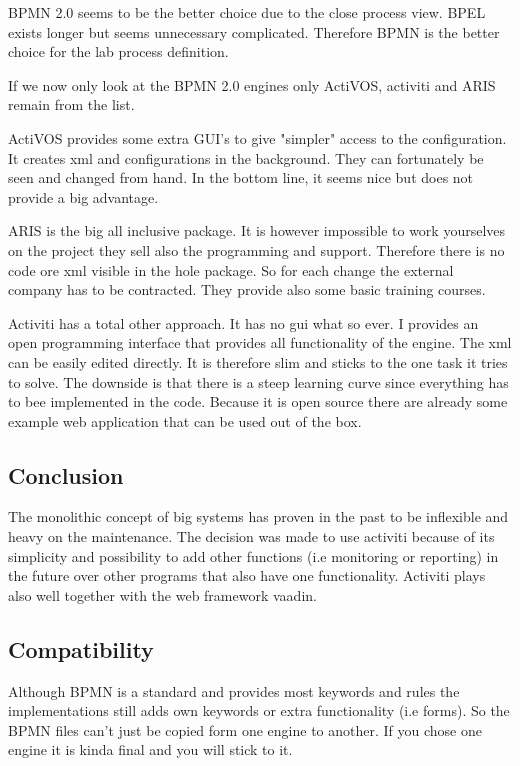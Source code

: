 \documentclass[paper=a4,twoside=false,BCOR=0mm,DIV=calc,fontsize=12pt]{scrartcl}
\begin{document}
BPMN 2.0 seems to be the better choice due to the close process view. BPEL exists longer but seems unnecessary complicated.
Therefore BPMN is the better choice for the lab process definition. 

If we now only look at the BPMN 2.0 engines only ActiVOS, activiti and ARIS remain from the list.

ActiVOS provides some extra GUI's to give "simpler" access to the configuration. It creates xml and configurations in the background.
They can fortunately be seen and changed from hand. In the bottom line, it seems nice but does not provide a big advantage. 

ARIS is the big all inclusive package. It is however impossible to work yourselves on the project they sell also the programming and support. Therefore there is no code ore xml visible in the hole package. So for each change the external company has to be contracted.
They provide also some basic training courses.

Activiti has a total other approach. It has no gui what so ever. I provides an open programming interface that provides all functionality 
of the engine. The xml can be easily edited directly. It is therefore slim and sticks to the one task it tries to solve.
The downside is that there is a steep learning curve since everything has to bee implemented in the code. 
Because it is open source there are already some example web application that can be used out of the box. 

\subsection{Conclusion}
The monolithic concept of big systems has proven in the past to be inflexible and heavy on the maintenance. 
The decision was made to use activiti because of its simplicity and possibility to add other functions (i.e monitoring or reporting) in the future over other programs that also have one functionality.
Activiti plays also well together with the web framework vaadin.


\subsection{Compatibility}
Although BPMN is a standard and provides most keywords and rules the implementations still adds own keywords or extra functionality (i.e
forms). So the BPMN files can't just be copied form one engine to another. If you chose one engine it is kinda final and you will stick to it.
\end{document}
